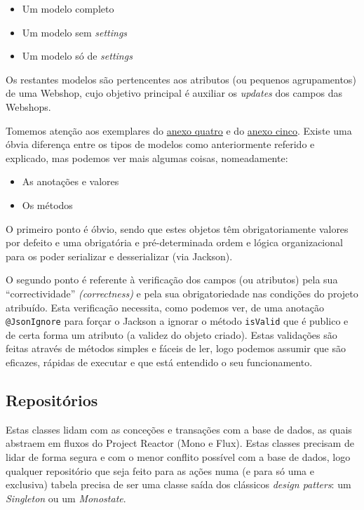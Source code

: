 \begin{itemize}
  \item Um modelo completo
  \item Um modelo sem \textit{settings}
  \item Um modelo só de \textit{settings}
\end{itemize}

Os restantes modelos são pertencentes aos atributos (ou pequenos agrupamentos) de uma Webshop, cujo objetivo principal é auxiliar os \textit{updates} dos campos das Webshops.

Tomemos atenção aos exemplares do \hyperref[an4]{anexo quatro} e do \hyperref[an5]{anexo cinco}. Existe uma óbvia diferença entre os tipos de modelos como anteriormente referido e explicado, mas podemos ver mais algumas coisas, nomeadamente:

\begin{itemize}
  \item As anotações e valores
  \item Os métodos
\end{itemize}

O primeiro ponto é óbvio, sendo que estes objetos têm obrigatoriamente valores por defeito e uma obrigatória e pré-determinada ordem e lógica organizacional para os poder serializar e desserializar (via Jackson).

O segundo ponto é referente à verificação dos campos (ou atributos) pela sua ``correctividade'' \textit{(correctness)} e pela sua obrigatoriedade nas condições do projeto atribuído. Esta verificação necessita, como podemos ver, de uma anotação \texttt{@JsonIgnore} para forçar o Jackson a ignorar o método \texttt{isValid} que é publico e de certa forma um atributo (a validez do objeto criado). Estas validações são feitas através de métodos simples e fáceis de ler, logo podemos assumir que são eficazes, rápidas de executar e que está entendido o seu funcionamento.

\newpage

\subsection{Repositórios}

Estas classes lidam com as conceções e transações com a base de dados, as quais abstraem em fluxos do Project Reactor (Mono e Flux). Estas classes precisam de lidar de forma segura e com o menor conflito possível com a base de dados, logo qualquer repositório que seja feito para as ações numa (e para só uma e exclusiva) tabela precisa de ser uma classe saída dos clássicos \textit{design patters}: um \textit{Singleton} ou um \textit{Monostate}.

